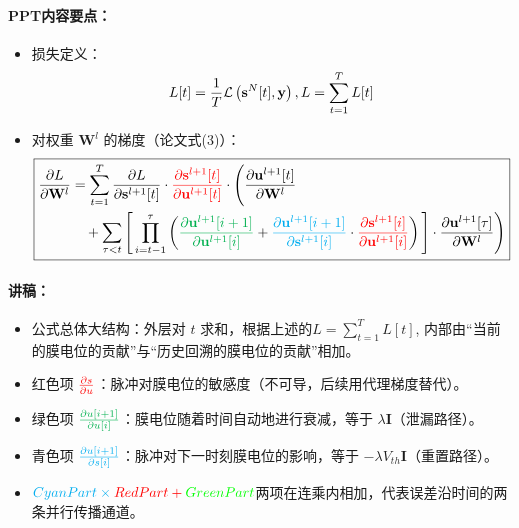 \documentclass[journal,12pt,onecolumn]{IEEEtran}
\begin{document}
\paragraph{\textbf{PPT内容要点：}}
\begin{itemize}
    \item 损失定义：
  \begin{equation}
    L[t]=\frac{1}{T}\mathcal{L}\left(\mathbf{s}^N[t], \mathbf{y}\right), L = \sum_{t=1}^T L[t]
    \label{instantaneous loss}
  \vspace{-2mm}
  \end{equation}
    \item 对权重 \(\mathbf{W}^l\) 的梯度（论文式(3)）：
    \[
    \boxed{
    \begin{aligned}
    \frac{\partial L}{\partial \mathbf{W}^l} 
    &= \sum_{t=1}^T 
    \frac{\partial L}{\partial \mathbf{s}^{l+1}[t]}
    \cdot
    {\color{red}{\frac{\partial \mathbf{s}^{l+1}[t]}{\partial \mathbf{u}^{l+1}[t]}}}
    \cdot
    \Bigg(
    \frac{\partial \mathbf{u}^{l+1}[t]}{\partial \mathbf{W}^l}
    \\
    &\quad + 
    \sum_{\tau < t} 
    \Bigg[
    \prod_{i=t-1}^{\tau}
    \left(
    {\color[rgb]{0,0.69,0.31}{\frac{\partial \mathbf{u}^{l+1}[i+1]}{\partial \mathbf{u}^{l+1}[i]}}}
    +
    {\color{cyan}{\frac{\partial \mathbf{u}^{l+1}[i+1]}{\partial \mathbf{s}^{l+1}[i]}}}
    \cdot
    {\color{red}{\frac{\partial \mathbf{s}^{l+1}[i]}{\partial \mathbf{u}^{l+1}[i]}}}
    \right)
    \Bigg]
    \cdot
    \frac{\partial \mathbf{u}^{l+1}[\tau]}{\partial \mathbf{W}^l}
    \Bigg)
    \end{aligned}
    }
    \]
\end{itemize}
\paragraph{\textbf{讲稿：}}
\begin{itemize}
    \item 公式总体大结构：外层对 \(t\) 求和，根据上述的\(L = \sum_{t=1}^T L[t]\), 内部由“当前的膜电位的贡献”与“历史回溯的膜电位的贡献”相加。
    \item 红色项 \({\color{red}{\frac{\partial s}{\partial u}}}\)：脉冲对膜电位的敏感度（不可导，后续用代理梯度替代）。
    \item 绿色项 \({\color[rgb]{0,0.69,0.31}{\frac{\partial u[i+1]}{\partial u[i]}}}\)：膜电位随着时间自动地进行衰减，等于 \(\lambda \mathbf{I}\)（泄漏路径）。
    \item 青色项 \({\color{cyan}{\frac{\partial u[i+1]}{\partial s[i]}}}\)：脉冲对下一时刻膜电位的影响，等于 \(-\lambda V_{th}\mathbf{I}\)（重置路径）。
    \item \(\color{cyan}{CyanPart}\times\color{red}{RedPart}+\color{green}{GreenPart}\)两项在连乘内相加，代表误差沿时间的两条并行传播通道。
\end{itemize}
\end{document}

